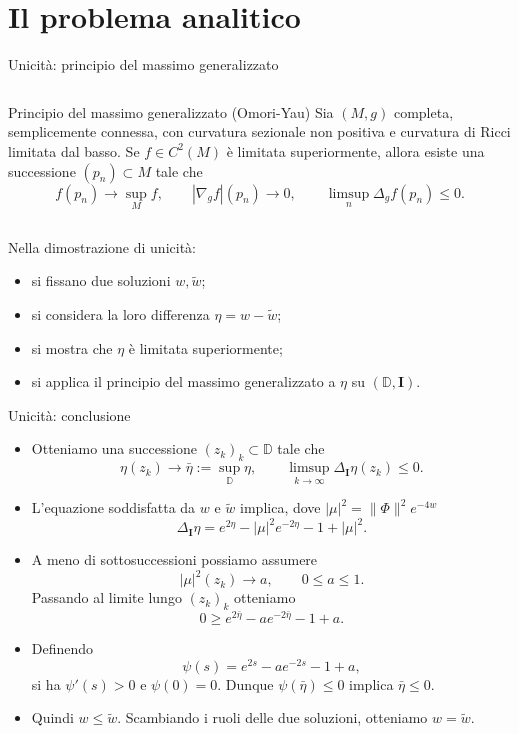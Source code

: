 \documentclass[aspectratio=169,11pt]{beamer}
\newcommand{\D}{\mathbb{D}}
\newcommand{\I}{\mathbf{I}}
\begin{document}
\section{Il problema analitico}



\begin{frame}[t]{Unicità: principio del massimo generalizzato}
  \begin{columns}[T,onlytextwidth]
    \hfill
    \begin{block}{Principio del massimo generalizzato (Omori-Yau) }
      Sia $(M,g)$ completa, semplicemente connessa, con curvatura sezionale
      non positiva e curvatura di Ricci limitata dal basso. Se
      $f\in C^2(M)$ è limitata superiormente, allora esiste una successione
      $(p_n)\subset M$ tale che
      \[
        f(p_n)\to \sup_M f,\qquad
        |\nabla_g f|(p_n)\to 0,\qquad
        \limsup_n \Delta_g f(p_n)\le 0.
      \]
    \end{block}
    \hfill
  \end{columns}

  \vspace{2mm}
  Nella dimostrazione di unicità:
  \begin{itemize}
    \item si fissano due soluzioni $w,\tilde w$;
    \item si considera la loro differenza $\eta=w-\tilde w$;
    \item si mostra che $\eta$ è limitata superiormente;
    \item si applica il principio del massimo generalizzato a $\eta$ su $(\mathbb{D},\I)$.
  \end{itemize}
\end{frame}
\begin{frame}[t]{Unicità: conclusione}

\begin{itemize}
  \item Otteniamo una successione $(z_k)_k\subset\D$ tale che
  \[
    \eta(z_k)\to \bar\eta:=\sup_\D\eta,
    \qquad
    \limsup_{k\to\infty}\Delta_\I\eta(z_k)\leq 0.
  \]

  \item L'equazione soddisfatta da $w$ e $\tilde w$ implica, dove $|\mu|^2 = \|\Phi\|^2 e^{-4w}$
  \[
    \Delta_\I\eta
    =
    e^{2\eta}-|\mu|^2e^{-2\eta}-1+|\mu|^2.
  \]

  \item A meno di sottosuccessioni possiamo
  assumere
  \[
    |\mu|^2(z_k)\to a,
    \qquad
    0\leq a\leq 1.
  \]
  Passando al limite lungo $(z_k)_k$ otteniamo
  \[
    0
    \geq
    e^{2\bar\eta}-ae^{-2\bar\eta}-1+a.
  \]

  \item Definendo
  \[
    \psi(s)=e^{2s}-ae^{-2s}-1+a,
  \]
  si ha $\psi'(s)>0$ e $\psi(0)=0$. Dunque
  $\psi(\bar\eta)\leq 0$ implica $\bar\eta\leq 0$.

  \item Quindi $w\leq \tilde w$. Scambiando i ruoli delle due soluzioni,
  otteniamo $w=\tilde w$.
\end{itemize}
\end{frame}
\end{document}
